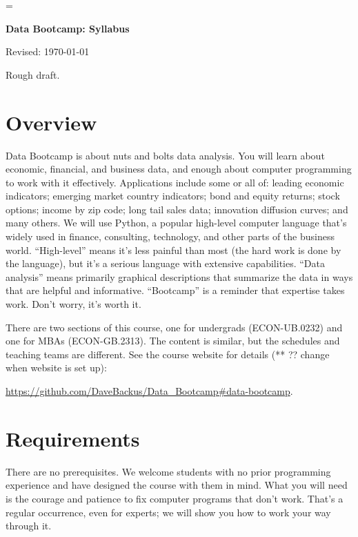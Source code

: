 \documentclass[11pt]{article}
\begin{document}
\parskip=\bigskipamount
\parindent=0.0in
\thispagestyle{empty}


\bigskip\bigskip
\centerline{\Large \bf Data Bootcamp:  Syllabus}
\centerline{Revised: \today}


Rough draft.

\section*{Overview}

Data Bootcamp is about nuts and bolts data analysis. You will learn about economic, financial, and business
data, and enough about computer programming to work with it effectively.
Applications include some or all of: leading economic indicators; emerging market country indicators;
bond and equity returns; stock options; income by zip code; long tail sales data; innovation diffusion curves; and many others.
We will use Python, a popular high-level computer language that's widely used in finance, consulting,
technology, and other parts of the business world.
``High-level'' means it's less painful than most (the hard work is done by the language),
but it's a serious language with extensive capabilities.
``Data analysis'' means primarily graphical descriptions that summarize the data
in ways that are helpful and informative.
``Bootcamp'' is a reminder that expertise takes work. Don't worry, it's worth it.

There are two sections of this course,
one for undergrads (ECON-UB.0232) and one for MBAs (ECON-GB.2313).
The content is similar, but the schedules and teaching teams are different.
See the course website for details (** ?? change when website is set up):

\vspace{-0.2in}
\begin{center}
\url{https://github.com/DaveBackus/Data_Bootcamp#data-bootcamp}.
\end{center}



\section*{Requirements}

There are no prerequisites.
We welcome students with no prior programming experience and have designed the course with them in mind.
What you will need is the courage and patience to fix computer programs that don't work.  
That's a regular occurrence, even for experts;
we will show you how to work your way through it.
\end{document}
